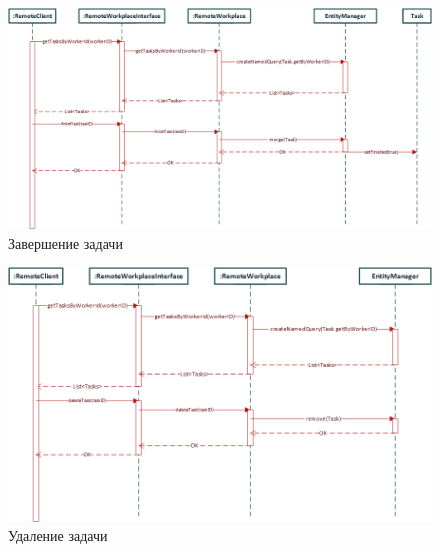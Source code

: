 \begin{figure}[H]
	\centering
	\includegraphics[width=1\textwidth]{../materials/SeqFinish.png}
	\caption{Завершение задачи}
	\label{fig:SeqFin}
\end{figure}

\begin{figure}[H]
	\centering
	\includegraphics[width=1\textwidth]{../materials/SeqDel.png}
	\caption{Удаление задачи}
	\label{fig:SeqDel}
\end{figure}
